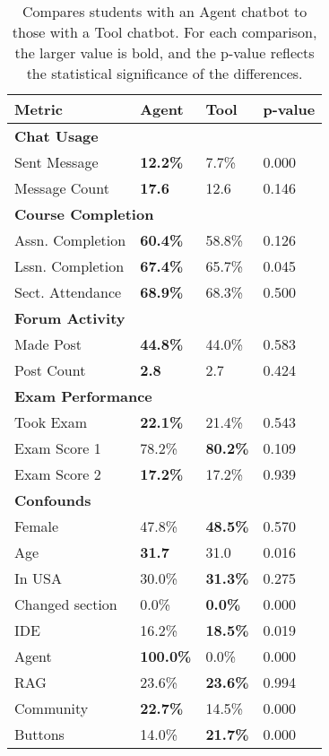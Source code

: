 \begin{table}
\centering
\begin{tabularx}{\columnwidth}{l X X X}
\toprule
\textbf{Metric} & \textbf{Agent} & \textbf{Tool} & \textbf{p-value} \\
\midrule
\multicolumn{4}{l}{\textbf{Chat Usage}} \\
Sent Message & \textbf{12.2\%} & 7.7\% & 0.000 \\
Message Count & \textbf{17.6} & 12.6 & 0.146 \\
\midrule
\multicolumn{4}{l}{\textbf{Course Completion}} \\
Assn. Completion & \textbf{60.4\%} & 58.8\% & 0.126 \\
Lssn. Completion & \textbf{67.4\%} & 65.7\% & 0.045 \\
Sect. Attendance & \textbf{68.9\%} & 68.3\% & 0.500 \\
\midrule
\multicolumn{4}{l}{\textbf{Forum Activity}} \\
Made Post & \textbf{44.8\%} & 44.0\% & 0.583 \\
Post Count & \textbf{2.8} & 2.7 & 0.424 \\
\midrule
\multicolumn{4}{l}{\textbf{Exam Performance}} \\
Took Exam & \textbf{22.1\%} & 21.4\% & 0.543 \\
Exam Score 1 & 78.2\% & \textbf{80.2\%} & 0.109 \\
Exam Score 2 & \textbf{17.2\%} & 17.2\% & 0.939 \\
\midrule
\multicolumn{4}{l}{\textbf{Confounds}} \\
Female & 47.8\% & \textbf{48.5\%} & 0.570 \\
Age & \textbf{31.7} & 31.0 & 0.016 \\
In USA & 30.0\% & \textbf{31.3\%} & 0.275 \\
Changed section & 0.0\% & \textbf{0.0\%} & 0.000 \\
IDE & 16.2\% & \textbf{18.5\%} & 0.019 \\
Agent & \textbf{100.0\%} & 0.0\% & 0.000 \\
RAG & 23.6\% & \textbf{23.6\%} & 0.994 \\
Community & \textbf{22.7\%} & 14.5\% & 0.000 \\
Buttons & 14.0\% & \textbf{21.7\%} & 0.000 \\
\bottomrule
\end{tabularx}
\caption{Compares students with an Agent chatbot to those with a Tool chatbot. For each comparison, the larger value is bold, and the p-value reflects the statistical significance of the differences.}
\label{tab:personification-table}
\end{table}